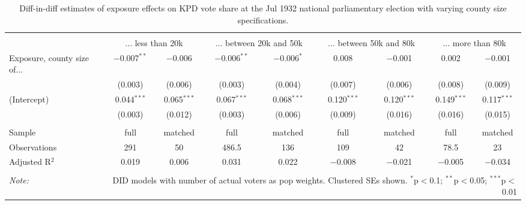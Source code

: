 
\begin{table}[!htbp] \centering 
  \caption{Diff-in-diff estimates of exposure effects on KPD vote share at the Jul 1932 national parliamentary election with varying county size specifications.\vspace{-.25cm}} 
  \label{tab:nsdap-voteshare-kpd-countysize-dd-1932-1} 
\scriptsize 
\begin{tabular}{@{\extracolsep{5pt}}lcccccccc} 
\\[-1.8ex]\hline 
\hline \\[-1.8ex] 
 & \multicolumn{2}{c}{... less than 20k } & \multicolumn{2}{c}{... between 20k and 50k} & \multicolumn{2}{c}{... between 50k and 80k} & \multicolumn{2}{c}{... more than 80k} \\ 
 \cmidrule(r){2-3}\cmidrule(r){4-5}\cmidrule(r){6-7}\cmidrule(r){8-9}Exposure, county size of... & $-$0.007$^{**}$ & $-$0.006 & $-$0.006$^{**}$ & $-$0.006$^{*}$ & 0.008 & $-$0.001 & 0.002 & $-$0.001 \\ 
  & (0.003) & (0.006) & (0.003) & (0.004) & (0.007) & (0.006) & (0.008) & (0.009) \\ 
  (Intercept) & 0.044$^{***}$ & 0.065$^{***}$ & 0.067$^{***}$ & 0.068$^{***}$ & 0.120$^{***}$ & 0.120$^{***}$ & 0.149$^{***}$ & 0.117$^{***}$ \\ 
  & (0.003) & (0.012) & (0.003) & (0.006) & (0.009) & (0.016) & (0.016) & (0.015) \\ 
 \hline \\[-1.8ex] 
Sample & full & matched & full & matched & full & matched & full & matched \\ 
Observations & 291 & 50 & 486.5 & 136 & 109 & 42 & 78.5 & 23 \\ 
Adjusted R$^{2}$ & 0.019 & 0.006 & 0.031 & 0.022 & $-$0.008 & $-$0.021 & $-$0.005 & $-$0.034 \\ 
\hline 
\hline \\[-1.8ex] 
\textit{Note:}  & \multicolumn{8}{r}{DID models with number of actual voters as pop weights. Clustered SEs shown. $^{*}$p$<$0.1; $^{**}$p$<$0.05; $^{***}$p$<$0.01} \\ 
\end{tabular} 
\end{table} 
